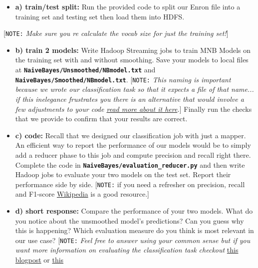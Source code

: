 \documentclass[11pt]{article}
\providecommand{\tightlist}{%
      \setlength{\itemsep}{0pt}\setlength{\parskip}{0pt}}
\begin{document}
\begin{itemize}
\tightlist
\item
  \textbf{a) train/test split:} Run the provided code to split our Enron
  file into a training set and testing set then load them into HDFS.
\end{itemize}

{[}\texttt{NOTE:} \emph{Make sure you re calculate the vocab size for
just the training set!}{]}

\begin{itemize}
\item
  \textbf{b) train 2 models:} Write Hadoop Streaming jobs to train MNB
  Models on the training set with and without smoothing. Save your
  models to local files at
  \textbf{\texttt{NaiveBayes/Unsmoothed/NBmodel.txt}} and
  \textbf{\texttt{NaiveBayes/Smoothed/NBmodel.txt}}. {[}\texttt{NOTE:}
  \emph{This naming is important because we wrote our classification
  task so that it expects a file of that name... if this inelegance
  frustrates you there is an alternative that would involve a few
  adjustments to your code
  \href{http://www.tnoda.com/blog/2013-11-23}{read more about it
  here}.}{]} Finally run the checks that we provide to confirm that your
  results are correct.
\item
  \textbf{c) code:} Recall that we designed our classification job with
  just a mapper. An efficient way to report the performance of our
  models would be to simply add a reducer phase to this job and compute
  precision and recall right there. Complete the code in
  \textbf{\texttt{NaiveBayes/evaluation\_reducer.py}} and then write
  Hadoop jobs to evaluate your two models on the test set. Report their
  performance side by side. {[}\texttt{NOTE:} if you need a refresher on
  precision, recall and F1-score
  \href{https://en.wikipedia.org/wiki/F1_score}{Wikipedia} is a good
  resource.{]}
\item
  \textbf{d) short response:} Compare the performance of your two
  models. What do you notice about the unsmoothed model's predictions?
  Can you guess why this is happening? Which evaluation measure do you
  think is most relevant in our use case? {[}\texttt{NOTE:} \emph{Feel
  free to answer using your common sense but if you want more
  information on evaluating the classification task checkout}
  \href{https://tryolabs.com/blog/2013/03/25/why-accuracy-alone-bad-measure-classification-tasks-and-what-we-can-do-about-it/}{this
  blogpost} or
  \href{http://www.flinders.edu.au/science_engineering/fms/School-CSEM/publications/tech_reps-research_artfcts/TRRA_2007.pdf}{this
}
\end{itemize}
\end{document}
